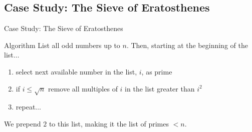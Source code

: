 \documentclass[smaller,handout,table]{beamer}
\begin{document}
\subsection{Case Study: The Sieve of Eratosthenes}
\begin{frame}{Case Study: The Sieve of Eratosthenes}

\begin{block}{Algorithm}
List all odd numbers up to $n$. Then, starting at the beginning of the list$\ldots$
\begin{enumerate}
\item select next available number in the list, $i$, as prime
\item if $i \le \sqrt{n}$ remove all multiples of $i$ in the list greater than $i^2$
\item repeat$\ldots$
\end{enumerate}
We prepend $2$ to this list, making it the list of primes $< n$.
\end{block}
\end{frame}
\end{document}
